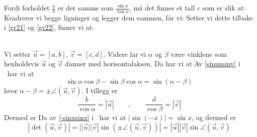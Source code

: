 Fordi forholdet $ \frac{a}{b}$ er det samme som $ \frac{\sin x}{\tan x} $, må det finnes et tall $ c $ som er slik at:
Kvadrerer vi begge ligninger og legger dem sammen, får vi:
Setter vi dette tilbake i \eqref{gr21} og \eqref{gr22}, finner vi at:

 \\
Vi setter $ \vec{u}=[a, b] $, $ \vec{v}=[c, d] $. Videre lar vi $ \alpha $ og $\beta $ være vinklene som henholdsvis $ \vec{u} $ og $ \vec{v} $ danner med horisontalaksen. Da har vi at
Av \eqref{sinuminv} i \tmto\ har vi at
\[ \sin \alpha \cos \beta-\sin \beta \cos\alpha = \sin(\alpha-\beta) \]
hvor $ \alpha-\beta=\pm \angle(\vec{u}, \vec{v}) $. I tillegg er 
\[ \frac{b}{\cos \alpha}=|\vec{u}|\qquad,\qquad\frac{d}{\cos \beta}=|\vec{v}| \]
Dermed er
Da av \eqref{-sinxsinx} i \tmto\ har vi at $ |\sin (-x)|=\sin x $, og dermed er
\[|\det(\vec{u}, \vec{v})|= ||\vec{u}||\vec{v}|\sin(\pm \angle(\vec{u}, \vec{v}))|=|\vec{u}||\vec{v}|\sin \angle(\vec{u}, \vec{v}) \]



